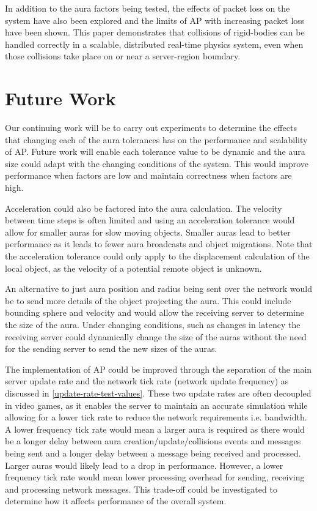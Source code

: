 In addition to the aura factors being tested, the effects of packet loss on the system have also been explored and the limits of AP with increasing packet loss have been shown. This paper demonstrates that collisions of rigid-bodies can be handled correctly in a scalable, distributed real-time physics system, even when those collisions take place on or near a server-region boundary.

\section{Future Work}
Our continuing work will be to carry out experiments to determine the effects that changing each of the aura tolerances has on the performance and scalability of AP. Future work will enable each tolerance value to be dynamic and the aura size could adapt with the changing conditions of the system. This would improve performance when factors are low and maintain correctness when factors are high.

Acceleration could also be factored into the aura calculation. The velocity between time steps is often limited and using an acceleration tolerance would allow for smaller auras for slow moving objects. Smaller auras lead to better performance as it leads to fewer aura broadcasts and object migrations. Note that the acceleration tolerance could only apply to the displacement calculation of the local object, as the velocity of a potential remote object is unknown.

An alternative to just aura position and radius being sent over the network would be to send more details of the object projecting the aura. This could include bounding sphere and velocity and would allow the receiving server to determine the size of the aura. Under changing conditions, such as changes in latency the receiving server could dynamically change the size of the auras without the need for the sending server to send the new sizes of the auras.

The implementation of AP could be improved through the separation of the main server update rate and the network tick rate (network update frequency) as discussed in \ref{update-rate-test-values}. These two update rates are often decoupled in video games, as it enables the server to maintain an accurate simulation while allowing for a lower tick rate to reduce the network requirements i.e. bandwidth. A lower frequency tick rate would mean a larger aura is required as there would be a longer delay between aura creation/update/collisions events and messages being sent and a longer delay between a message being received and processed. Larger auras would likely lead to a drop in performance. However, a lower frequency tick rate would mean lower processing overhead for sending, receiving and processing network messages. This trade-off could be investigated to determine how it affects performance of the overall system.

